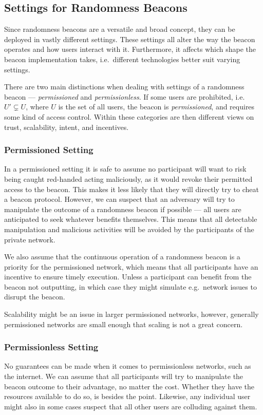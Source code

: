 \subsection{Settings for Randomness Beacons}
Since randomness beacons are a versatile and broad concept, they can be deployed in vastly different settings.
These settings all alter the way the beacon operates and how users interact with it.
Furthermore, it affects which shape the beacon implementation takes, i.e.\ different technologies better suit varying settings.

There are two main distinctions when dealing with settings of a randomness beacon --- \emph{permissioned} and \emph{permissionless}. If some users are prohibited, i.e.\ $U' \subsetneq U$, where $U$ is the set of all users, the beacon is \emph{permissioned}, and requires some kind of access control.
Within these categories are then different views on trust, scalability, intent, and incentives.

\subsubsection{Permissioned Setting}
In a permissioned setting it is safe to assume no participant will want to risk being caught red-handed acting maliciously, as it would revoke their permitted access to the beacon.
This makes it less likely that they will directly try to cheat a beacon protocol.
However, we can suspect that an adversary will try to manipulate the outcome of a randomness beacon if possible --- all users are anticipated to seek whatever benefits themselves.
This means that all detectable manipulation and malicious activities will be avoided by the participants of the private network.

We also assume that the continuous operation of a randomness beacon is a priority for the permissioned network, which means that all participants have an incentive to ensure timely execution.
Unless a participant can benefit from the beacon not outputting, in which case they might simulate e.g.\ network issues to disrupt the beacon.

Scalability might be an issue in larger permissioned networks, however, generally permissioned networks are small enough that scaling is not a great concern.

\subsubsection{Permissionless Setting}
No guarantees can be made when it comes to permissionless networks, such as the internet.
We can assume that all participants will try to manipulate the beacon outcome to their advantage, no matter the cost.
Whether they have the resources available to do so, is besides the point.
Likewise, any individual user might also in some cases suspect that all other users are colluding against them.

